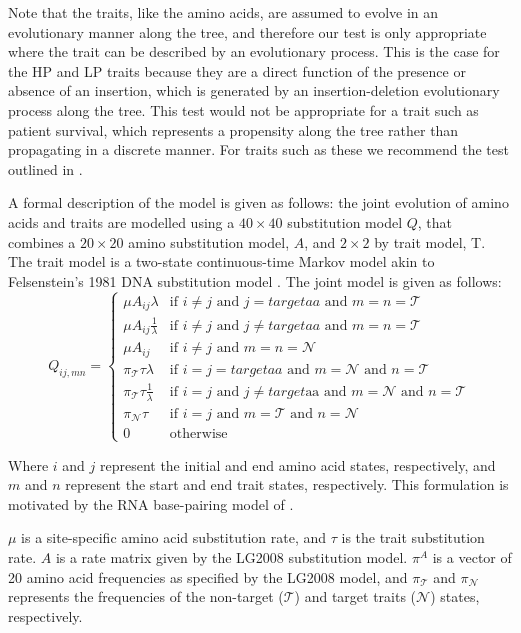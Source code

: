 \documentclass[]{article}
\begin{document}
Note that the traits, like the amino acids, are assumed to evolve in an evolutionary manner along the tree, and therefore our test is only appropriate where the trait can be described by an evolutionary process. This is the case for the HP and LP traits because they are a direct function of the presence or absence of an insertion, which is generated by an insertion-deletion evolutionary process along the tree. This test would not be appropriate for a trait such as patient survival, which represents a propensity along the tree rather than propagating in a discrete manner. For traits such as these we recommend the test outlined in \citet{bhattacharya2007founder}.

A formal description of the model is given as follows: the joint evolution of amino acids and traits are modelled using a $40\times{40}$ substitution model $Q$, that combines a $20\times{20}$ amino substitution model, $A$, and $2\times{2}$ by trait model, T. The trait model is a two-state continuous-time Markov model akin to Felsenstein's 1981 DNA substitution model \citep{felsenstein1981evolutionary}. The joint model is given as follows:
\begin{equation}
Q_{ij,mn}=\begin{cases}
\mu A_{ij}\lambda & \text{if }i\neq j\text{ and }j=targetaa\text{ and }m=n=\mathcal{T}\\
\mu A_{ij}\frac{1}{\lambda} & \text{if }i\neq j\text{ and }j\neq targetaa\text{ and }m=n=\mathcal{T}\\
\mu A_{ij} & \text{if }i\neq j\text{ and }m=n=\mathcal{N}\\
\pi_{\mathcal{T}}\tau\lambda & \text{if }i=j=targetaa\text{ and }m=\mathcal{N}\text{ and }n=\mathcal{T}\\
\pi_{\mathcal{T}}\tau\frac{1}{\lambda} & \text{if }i=j\text{ and }j\neq target\text{aa and }m=\mathcal{N}\text{ and }n=\mathcal{T}\\
\pi_{\mathcal{N}}\tau & \text{if }i=j\text{ and }m=\mathcal{T}\text{ and }n=\mathcal{N}\\
0 & \text{otherwise}
\end{cases}
\end{equation}

Where $i$ and $j$ represent the initial and end amino acid states, respectively, and $m$ and $n$ represent the start and end trait states, respectively. This formulation is motivated by the RNA base-pairing model of \citet{muse1995evolutionary}.

$\mu$ is a site-specific amino acid substitution rate, and $\tau$ is the trait substitution rate. $A$ is a rate matrix given by the LG2008 substitution model. $\pi^{A}$ is a vector of 20 amino acid frequencies as specified by the LG2008 model, and $\pi_{\mathcal{T}}$ and  $\pi_{\mathcal{N}}$ represents the frequencies of the non-target ($\mathcal{T}$) and target traits ($\mathcal{N}$) states, respectively. 
\end{document}

